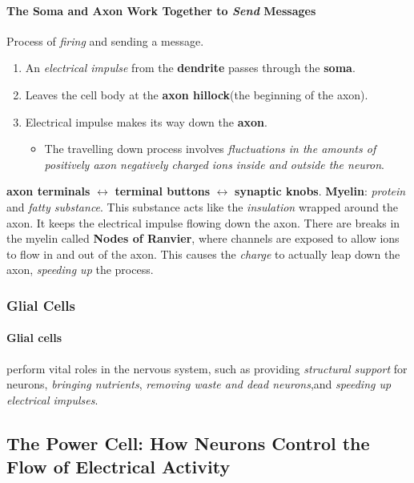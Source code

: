 \documentclass{article}
\begin{document}
 	\paragraph{The Soma and Axon Work Together to \emph{Send} Messages} \quad
 	\newline Process of \emph{firing} and sending a message.
 	\begin{enumerate}
 		\item An \emph{electrical impulse} from the \textbf{dendrite} passes through the \textbf{soma}.
 		\item Leaves the cell body at the \textbf{axon hillock}(the beginning of the axon).
 		\item Electrical impulse makes its way down the \textbf{axon}.
 		\begin{itemize}
 			\item The travelling down process involves \emph{fluctuations in the amounts of positively axon negatively charged ions inside and outside the neuron}.
 		\end{itemize}
 	\end{enumerate}
 	\quad
 	\newline \textbf{axon terminals} $\leftrightarrow$ \textbf{terminal buttons} $\leftrightarrow$ \textbf{synaptic knobs}.
 	\newline \textbf{Myelin}: \emph{protein} and \emph{fatty substance}. This substance acts like the \emph{insulation} wrapped around the axon. It keeps the electrical impulse flowing down the axon. There are breaks in the myelin called \textbf{Nodes of Ranvier}, where channels are exposed to allow ions to flow in and out of the axon. This causes the \emph{charge} to actually leap down the axon, \emph{speeding up} the process.
 	\subsubsection{Glial Cells}
 	\paragraph{Glial cells} perform vital roles in the nervous system, such as providing \emph{structural support} for neurons, \emph{bringing nutrients}, \emph{removing waste and dead neurons},and \emph{speeding up electrical impulses}. 
 	\subsection{The Power Cell: How Neurons Control the Flow of Electrical Activity}
\end{document}
